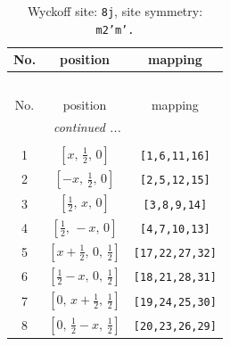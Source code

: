 \documentclass[fleqn,8pt]{jsarticle}
\begin{document}
\begin{longtable}{ccc}
\caption{Wyckoff site: {\tt 8j}, site symmetry: {\tt m2'm'.}}
 \\
 \hline \hline
No. & position & mapping \\ \hline \endfirsthead

\multicolumn{2}{l}{\tablename\ \thetable{}} \\
 \hline \hline
No. & position & mapping \\ \hline \endhead

 \hline \hline
\multicolumn{2}{r}{\footnotesize\it continued ...} \\ \endfoot

 \hline \hline
\multicolumn{2}{r}{} \\ \endlastfoot

1 & $\left[ x,\, \frac{1}{2},\, 0 \right]$ & {\tt [1,6,11,16]} \\ \hline
2 & $\left[ - x,\, \frac{1}{2},\, 0 \right]$ & {\tt [2,5,12,15]} \\ \hline
3 & $\left[ \frac{1}{2},\, x,\, 0 \right]$ & {\tt [3,8,9,14]} \\ \hline
4 & $\left[ \frac{1}{2},\, - x,\, 0 \right]$ & {\tt [4,7,10,13]} \\ \hline
5 & $\left[ x + \frac{1}{2},\, 0,\, \frac{1}{2} \right]$ & {\tt [17,22,27,32]} \\ \hline
6 & $\left[ \frac{1}{2} - x,\, 0,\, \frac{1}{2} \right]$ & {\tt [18,21,28,31]} \\ \hline
7 & $\left[ 0,\, x + \frac{1}{2},\, \frac{1}{2} \right]$ & {\tt [19,24,25,30]} \\ \hline
8 & $\left[ 0,\, \frac{1}{2} - x,\, \frac{1}{2} \right]$ & {\tt [20,23,26,29]} \\
\end{longtable}
\renewcommand{\arraystretch}{1.2}
\end{document}
